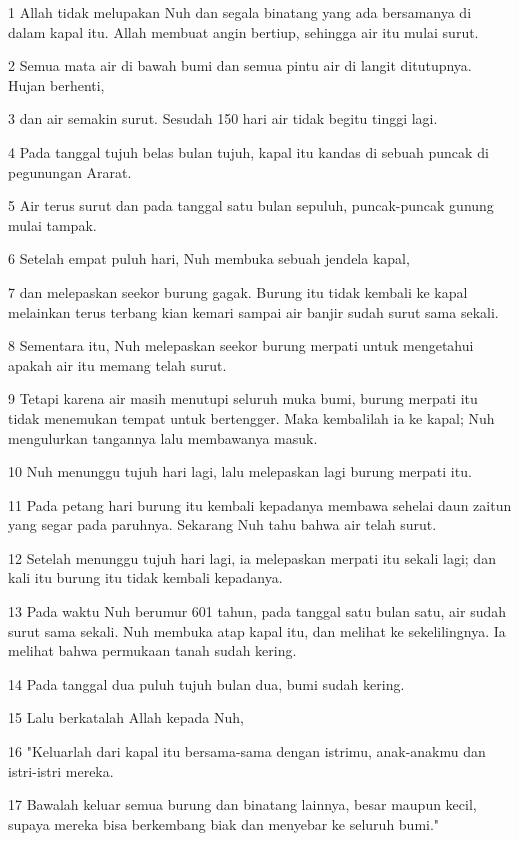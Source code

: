 \par 1 Allah tidak melupakan Nuh dan segala binatang yang ada bersamanya di dalam kapal itu. Allah membuat angin bertiup, sehingga air itu mulai surut.
\par 2 Semua mata air di bawah bumi dan semua pintu air di langit ditutupnya. Hujan berhenti,
\par 3 dan air semakin surut. Sesudah 150 hari air tidak begitu tinggi lagi.
\par 4 Pada tanggal tujuh belas bulan tujuh, kapal itu kandas di sebuah puncak di pegunungan Ararat.
\par 5 Air terus surut dan pada tanggal satu bulan sepuluh, puncak-puncak gunung mulai tampak.
\par 6 Setelah empat puluh hari, Nuh membuka sebuah jendela kapal,
\par 7 dan melepaskan seekor burung gagak. Burung itu tidak kembali ke kapal melainkan terus terbang kian kemari sampai air banjir sudah surut sama sekali.
\par 8 Sementara itu, Nuh melepaskan seekor burung merpati untuk mengetahui apakah air itu memang telah surut.
\par 9 Tetapi karena air masih menutupi seluruh muka bumi, burung merpati itu tidak menemukan tempat untuk bertengger. Maka kembalilah ia ke kapal; Nuh mengulurkan tangannya lalu membawanya masuk.
\par 10 Nuh menunggu tujuh hari lagi, lalu melepaskan lagi burung merpati itu.
\par 11 Pada petang hari burung itu kembali kepadanya membawa sehelai daun zaitun yang segar pada paruhnya. Sekarang Nuh tahu bahwa air telah surut.
\par 12 Setelah menunggu tujuh hari lagi, ia melepaskan merpati itu sekali lagi; dan kali itu burung itu tidak kembali kepadanya.
\par 13 Pada waktu Nuh berumur 601 tahun, pada tanggal satu bulan satu, air sudah surut sama sekali. Nuh membuka atap kapal itu, dan melihat ke sekelilingnya. Ia melihat bahwa permukaan tanah sudah kering.
\par 14 Pada tanggal dua puluh tujuh bulan dua, bumi sudah kering.
\par 15 Lalu berkatalah Allah kepada Nuh,
\par 16 "Keluarlah dari kapal itu bersama-sama dengan istrimu, anak-anakmu dan istri-istri mereka.
\par 17 Bawalah keluar semua burung dan binatang lainnya, besar maupun kecil, supaya mereka bisa berkembang biak dan menyebar ke seluruh bumi."
